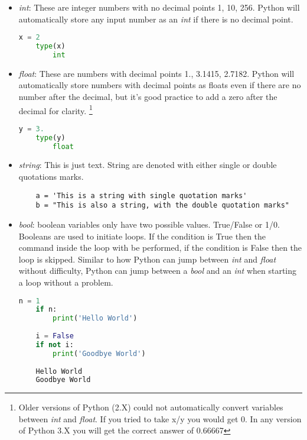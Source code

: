 \documentclass[12pt]{book}
\begin{document}
	\begin{itemize}
		\item \textit{int}: These are integer numbers with no decimal points 1, 10, 256. Python will automatically store any input number as an \textit{int} if there is no decimal point.
	\begin{lstlisting}[language=Python]
	x = 2
	type(x)
		int
	\end{lstlisting}
	
		\item \textit{float}: These are numbers with decimal points 1., 3.1415, 2.7182. Python will automatically store numbers with decimal points as floats even if there are no number after the decimal, but it's good practice to add a zero after the decimal for clarity. \footnote{Older versions of Python (2.X) could not automatically convert variables between \textit{int} and \textit{float}. If you tried to take x/y you would get 0. In any version of Python 3.X you will get the correct answer of 0.66667 }
	\begin{lstlisting}[language=Python] 
	y = 3.
	type(y)
		float
	\end{lstlisting} 
		
		\item \textit{string}: This is just text. String are denoted with either single or double quotations marks.
		\begin{lstlisting}
	a = 'This is a string with single quotation marks'
	b = "This is also a string, with the double quotation marks"
		\end{lstlisting}
	
		\item \textit{bool}: boolean variables only have two possible values. True/False or 1/0. Booleans are used to initiate loops. If the condition is True then the command inside the loop with be performed, if the condition is False then the loop is skipped. Similar to how Python can jump between \textit{int} and \textit{float} without difficulty, Python can jump between a \textit{bool} and an \textit{int} when starting a loop without a problem.
		\begin{lstlisting}[language = Python]
	n = 1
	if n:
		print('Hello World')
		
	i = False 
	if not i:
		print('Goodbye World')
		
	Hello World
	Goodbye World
		\end{lstlisting}
	\end{itemize}
	
\end{document}
